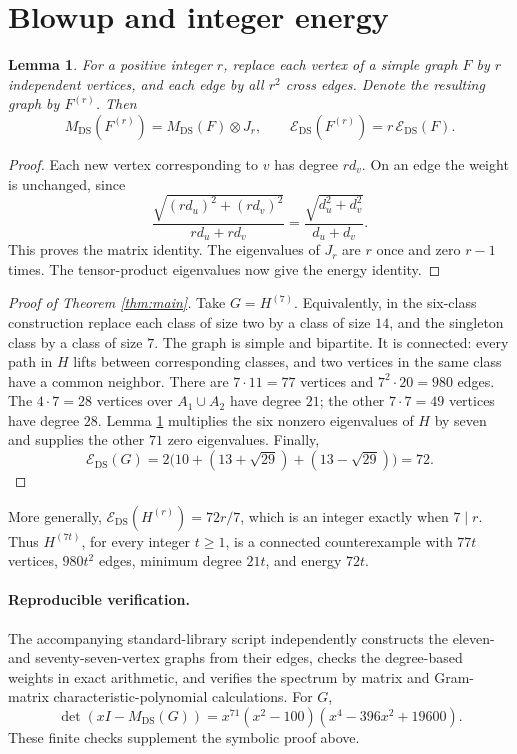 \documentclass[11pt]{article}
\newtheorem{lemma}{Lemma}
\newcommand{\DS}{\mathrm{DS}}
\newcommand{\E}{\mathcal E_{\DS}}
\begin{document}
\section*{Blowup and integer energy}
\begin{lemma}\label{lem:blowup}
For a positive integer \(r\), replace each vertex of a simple graph \(F\)
by \(r\) independent vertices, and each edge by all \(r^2\) cross edges.
Denote the resulting graph by \(F^{(r)}\). Then
\[
 M_{\DS}(F^{(r)})=M_{\DS}(F)\otimes J_r,\qquad
 \E(F^{(r)})=r\,\E(F).
\]
\end{lemma}
\begin{proof}
Each new vertex corresponding to \(v\) has degree \(rd_v\). On an edge
the weight is unchanged, since
\[
 \frac{\sqrt{(rd_u)^2+(rd_v)^2}}{rd_u+rd_v}
 =\frac{\sqrt{d_u^2+d_v^2}}{d_u+d_v}.
\]
This proves the matrix identity. The eigenvalues of \(J_r\) are \(r\)
once and zero \(r-1\) times. The tensor-product eigenvalues now give the
energy identity.
\end{proof}

\begin{proof}[Proof of Theorem \ref{thm:main}]
Take \(G=H^{(7)}\). Equivalently, in the six-class construction replace
each class of size two by a class of size \(14\), and the singleton
class by a class of size \(7\). The graph is simple and bipartite.
It is connected: every path in \(H\) lifts between corresponding classes,
and two vertices in the same class have a common neighbor.
There are \(7\cdot11=77\) vertices and \(7^2\cdot20=980\) edges.
The \(4\cdot7=28\) vertices over \(A_1\cup A_2\) have degree \(21\);
the other \(7\cdot7=49\) vertices have degree \(28\).
Lemma \ref{lem:blowup} multiplies the six nonzero eigenvalues of \(H\)
by seven and supplies the other \(71\) zero eigenvalues.
Finally,
\[
 \E(G)=2\bigl(10+(13+\sqrt{29})+(13-\sqrt{29})\bigr)=72.
\]
\end{proof}

More generally, \(\E(H^{(r)})=72r/7\), which is an integer exactly when
\(7\mid r\). Thus \(H^{(7t)}\), for every integer \(t\ge1\), is a connected
counterexample with \(77t\) vertices, \(980t^2\) edges, minimum degree
\(21t\), and energy \(72t\).

\paragraph{Reproducible verification.}
The accompanying standard-library script independently constructs the
eleven- and seventy-seven-vertex graphs from their edges, checks the
degree-based weights in exact arithmetic, and verifies the spectrum by
matrix and Gram-matrix characteristic-polynomial calculations. For \(G\),
\[
 \det(xI-M_{\DS}(G))
   =x^{71}(x^2-100)(x^4-396x^2+19600).
\]
These finite checks supplement the symbolic proof above.
\end{document}
